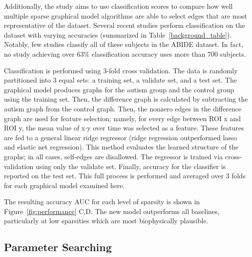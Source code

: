 \documentclass{article}
\begin{document}
Additionally, the study aims to use classification scores to compare how well multiple sparse graphical model algorithms are able to select edges that are most representative of the dataset. Several recent studies perform classification on the dataset with varying accuracies (summarized in  Table~\ref{background_table}). Notably, few studies classify all of these subjects in the ABIDE dataset. In fact, no study achieving over 63\% classification accuracy uses more than 700 subjects.

Classification is performed using 3-fold cross validation. The data is randomly partitioned into 3 equal sets: a training set, a validate set, and a test set. The graphical model produces graphs for the autism group and the control group using the training set. Then, the difference graph is calculated by subtracting the autism graph from the control graph. Then, the nonzero edges in the difference graph are used for feature selection; namely, for every edge between ROI x and ROI y, the mean value of x$\cdot$y over time was selected as a feature. These features are fed to a general linear ridge regressor (ridge regression outperformed lasso and elastic net regression). This method evaluates the learned structure of the graphs; in all cases, self-edges are disallowed. The regressor is trained via cross-validation using only the validate set. Finally, accuracy for the classifier is reported on the test set. This full process is performed and averaged over 3 folds for each graphical model examined here. 

The resulting accuracy AUC for each level of sparsity is shown in Figure~\ref{fig:performance} C,D. The new model outperforms all baselines, particularly at low sparsities which are most biophysically plausible. 

\subsection{Parameter Searching}
\end{document}
